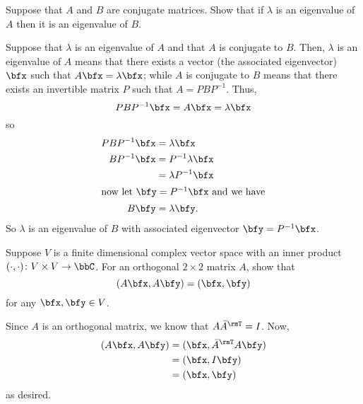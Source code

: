 \begin{questions}
  \question[4] Suppose that $A$ and $B$ are conjugate matrices. Show that
  if $\lambda$ is an eigenvalue of $A$ then it is an eigenvalue of $B$.
  \begin{solution}
    Suppose that $\lambda$ is an eigenvalue of $A$ and that $A$ is
    conjugate to $B$. Then, $\lambda$ is an eigenvalue of $A$ means that
    there exists a vector (the associated eigenvector) $\bfx$ such that
    $A\bfx=\lambda\bfx$; while $A$ is conjugate to $B$ means that there
    exists an invertible matrix $P$ such that $A=PBP^{-1}$. Thus,
    \[
      PBP^{-1}\bfx=A\bfx=\lambda\bfx
    \]
    so
    \begin{align*}
      PBP^{-1}\bfx
      &=\lambda\bfx\\
      BP^{-1}\bfx&=P^{-1}\lambda\bfx\\
      &=\lambda P^{-1}\bfx\\
      \intertext{now let $\bfy=P^{-1}\bfx$ and we have}
      B\bfy&=\lambda\bfy.
    \end{align*}
    So $\lambda$ is an eigenvalue of $B$ with associated eigenvector
    $\bfy=P^{-1}\bfx$.
  \end{solution}
  \question[6] Suppose $V$ is a finite dimensional complex vector space
  with an inner product $(\cdot,\cdot)\colon V\times V\to\bbC$. For an
  orthogonal $2\times 2$ matrix $A$, show that
  \[
    (A\bfx,A\bfy)=(\bfx,\bfy)
  \]
  for any $\bfx,\bfy\in V$.
  \begin{solution}
    Since $A$ is an orthogonal matrix, we know that $A{\bar
      A}^\rmT=I$. Now,
    \begin{align*}
      (A\bfx,A\bfy)
      &=(\bfx,{\bar A}^\rmT A\bfy)\\
      &=(\bfx,I\bfy)\\
      &=(\bfx,\bfy)
    \end{align*}
    as desired.
  \end{solution}
\end{questions}

